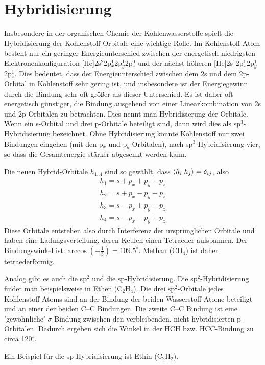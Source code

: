 \section{Hybridisierung}

Insbesondere in der organischen Chemie der Kohlenwasserstoffe spielt die Hybridisierung der Kohlenstoff-Orbitale eine wichtige Rolle. Im Kohlenstoff-Atom besteht nur ein geringer Energieunterschied zwischen der energetisch niedrigsten Elektronenkonfiguration
[He]2s$^2$2p$_x^1$2p$_y^1$2p$_z^0$ und der nächst höheren [He]2s$^1$2p$_x^1$2p$_y^1$2p$_z^1$. Dies bedeutet, dass der Energieunterschied zwischen dem 2s und dem 2p-Orbital in Kohlenstoff sehr gering ist, und insbesondere 
ist der Energiegewinn durch die Bindung sehr oft größer als dieser Unterschied. Es ist daher oft energetisch günstiger, die Bindung ausgehend von einer Linearkombination von 2s und 2p-Orbitalen zu betrachten. Dies nennt man Hybridisierung der Orbitale. Wenn ein s-Orbital und drei p-Orbitale beteiligt sind, dann wird dies als sp$^3$-Hybridisierung bezeichnet. Ohne Hybridisierung könnte Kohlenstoff nur zwei Bindungen eingehen (mit den p$_x$ und p$_y$-Orbitalen), nach sp$^3$-Hybridisierung vier, so dass die Gesamtenergie stärker abgesenkt werden kann.

Die neuen Hybrid-Orbitale $h_{1 .. 4}$ sind so gewählt, dass $\braket{h_i | h_j} = \delta_{ij}$, also
\begin{eqnarray}
 h_1 = s + p_x + p_y + p_z \\
 h_2 = s + p_x - p_y - p_z \\
 h_3 = s - p_x + p_y - p_z \\
 h_4 = s - p_x - p_y + p_z 
\end{eqnarray}
Diese Orbitale entstehen also durch Interferenz der ursprünglichen Orbitale und haben eine Ladungsverteilung, deren Keulen einen Tetraeder aufspannen. Der Bindungswinkel ist $\arccos (-\frac{1}{3}) = 109.5^\circ$. Methan (CH$_4$) ist daher tetraederförmig.

Analog gibt es auch die sp$^2$ und die sp-Hybridisierung.  Die sp$^2$-Hybridisierung findet man beispielsweise in Ethen (C$_2$H$_4$). Die drei  sp$^2$-Orbitale jedes Kohlenstoff-Atoms sind an der Bindung der beiden Wasserstoff-Atome beteiligt und an einer der beiden C--C Bindungen. Die zweite C--C Bindung ist eine 'gewöhnliche' $\sigma$-Bindung zwischen den verbleibenden, nicht hybridisierten p-Orbitalen. Dadurch ergeben sich die Winkel in der HCH bzw. HCC-Bindung zu circa 120$^\circ$.

Ein Beispiel für die sp-Hybridisierung ist Ethin (C$_2$H$_2$).

\printbibliography[segment=\therefsegment,heading=subbibliography]
